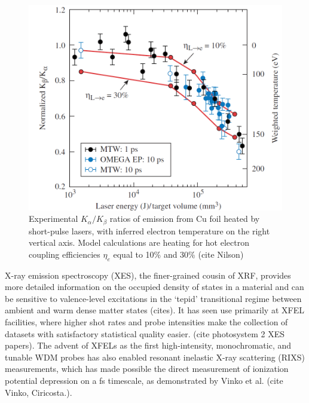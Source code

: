 \documentclass [11pt, proquest, article] {uwthesis}[2016/11/22]
\begin{document}
\begin{figure}[h] 
\caption{Experimental $K_\alpha/K_\beta$ ratios of emission from Cu foil heated by short-pulse lasers, with inferred electron temperature on the right vertical axis. Model calculations are heating for hot electron coupling efficiencies $\eta_e$ equal to 10\% and 30\% (cite Nilson)}
\label{fig:nilson}
\centering
\includegraphics[scale=0.5]{../Figures/nilson_branching.png}
\end{figure}

X-ray emission spectroscopy (XES), the finer-grained cousin of XRF, provides more detailed information on the occupied density of states in a material and can be sensitive to valence-level excitations in the `tepid' transitional regime between ambient and warm dense matter states (cites). It has seen use primarily at XFEL facilities, where higher shot rates and probe intensities make the collection of datasets with satisfactory statistical quality easier. (cite photosystem 2 XES papers). The advent of XFELs as the first high-intensity, monochromatic, and tunable WDM probes has also enabled resonant inelastic X-ray scattering (RIXS) measurements, which has made possible the direct measurement of ionization potential depression on a fs timescale, as demonstrated by Vinko et al. (cite Vinko, Ciricosta.).

\end{document}
